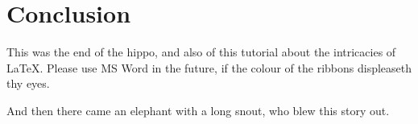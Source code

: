 \section{Conclusion}
\label{sec:Conclusion}
This was the end of the hippo, and also of this tutorial about the intricacies of \LaTeX. Please use MS Word in the future, if the colour of the ribbons displeaseth thy eyes. 

And then there came an elephant with a long snout, who blew this story out.